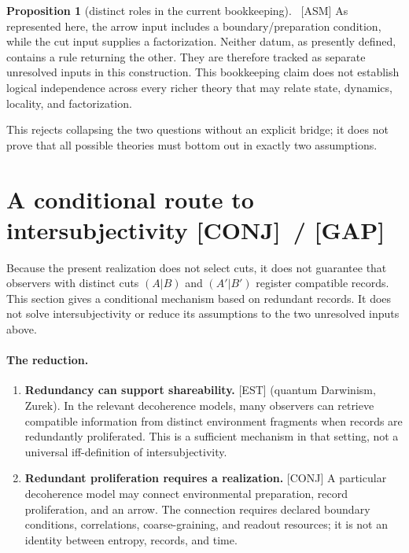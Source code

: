 \documentclass[11pt]{article}
\newcommand{\est}{\textcolor{teal!70!black}{\textsf{\small[EST]}}}
\newcommand{\fields}{\textcolor{violet}{\textsf{\small[FIELDS]}}}
\newcommand{\asm}{\textcolor{blue!70!black}{\textsf{\small[ASM]}}}
\newcommand{\conj}{\textcolor{orange!80!black}{\textsf{\small[CONJ]}}}
\newcommand{\post}{\textcolor{purple!70!black}{\textsf{\small[POST]}}}
\newcommand{\gap}{\textcolor{red!75!black}{\textsf{\small[GAP]}}}
\def\est{[EST]}\def\fields{[FIELDS]}\def\asm{[ASM]}%
\def\conj{[CONJ]}\def\post{[POST]}\def\gap{[GAP]}%
\def\quad{ }\def\normalsize{}%
\theoremstyle{definition}
\newtheorem{proposition}{Proposition}[section]
\theoremstyle{remark}
\begin{document}
\begin{proposition}[distinct roles in the current bookkeeping]\label{prop:indep}{\normalfont\ \asm}
As represented here, the arrow input includes a boundary/preparation condition, while the cut input supplies a factorization. Neither datum, as presently defined, contains a rule returning the other. They are therefore tracked as separate unresolved inputs in this construction. This bookkeeping claim does not establish logical independence across every richer theory that may relate state, dynamics, locality, and factorization.
\end{proposition}

\noindent This rejects collapsing the two questions without an explicit bridge; it does not prove that all possible theories must bottom out in exactly two assumptions.

\section{A conditional route to intersubjectivity \quad{\normalsize\conj\ / \gap}\label{sec:inter}}

Because the present realization does not select cuts, it does not guarantee that observers with distinct cuts $(A\vert B)$ and $(A'\vert B')$ register compatible records. This section gives a conditional mechanism based on redundant records. It does not solve intersubjectivity or reduce its assumptions to the two unresolved inputs above.

\paragraph{The reduction.}
\begin{enumerate}[leftmargin=1.6em, itemsep=2pt, topsep=3pt]
  \item \textbf{Redundancy can support shareability.} \est{} (quantum Darwinism, Zurek). In the relevant decoherence models, many observers can retrieve compatible information from distinct environment fragments when records are redundantly proliferated. This is a sufficient mechanism in that setting, not a universal iff-definition of intersubjectivity.
  \item \textbf{Redundant proliferation requires a realization.} \conj{} A particular decoherence model may connect environmental preparation, record proliferation, and an arrow. The connection requires declared boundary conditions, correlations, coarse-graining, and readout resources; it is not an identity between entropy, records, and time.
\end{enumerate}
\end{document}
